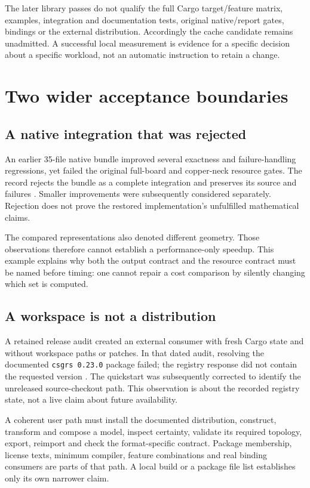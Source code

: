 \documentclass[11pt]{article}
\begin{document}
The later library passes do not qualify the full Cargo target/feature matrix,
examples, integration and documentation tests, original native/report gates,
bindings or the external distribution. Accordingly the cache candidate remains
unadmitted. A successful local measurement is evidence for a specific decision
about a specific workload, not an automatic instruction to retain a change.

\section{Two wider acceptance boundaries}
\subsection{A native integration that was rejected}
An earlier 35-file native bundle improved several exactness and failure-handling
regressions, yet failed the original full-board and copper-neck resource gates.
The record rejects the bundle as a complete integration and preserves its source
and failures \cite{native}. Smaller improvements were subsequently considered
separately. Rejection does not prove the restored implementation's unfulfilled
mathematical claims.

The compared representations also denoted different geometry. Those observations
therefore cannot establish a performance-only speedup. This example explains why
both the output contract and the resource contract must be named before timing:
one cannot repair a cost comparison by silently changing which set is computed.

\subsection{A workspace is not a distribution}
A retained release audit created an external consumer with fresh Cargo state and
without workspace paths or patches. In that dated audit, resolving the documented
\texttt{csgrs 0.23.0} package failed; the registry response did not contain the
requested version \cite{release}. The quickstart was subsequently corrected
to identify the unreleased source-checkout path. This observation is about the
recorded registry state, not a live claim about future availability.

A coherent user path must install the documented distribution, construct,
transform and compose a model, inspect certainty, validate its required topology,
export, reimport and check the format-specific contract. Package membership,
license texts, minimum compiler, feature combinations and real binding consumers
are parts of that path. A local build or a package file list establishes only its
own narrower claim.
\end{document}
